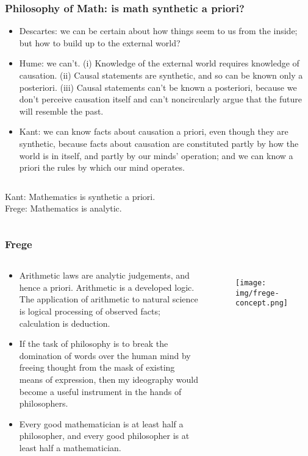 \documentclass[UTF8,11pt,colorlinks,compress,openany]{beamer}%
\begin{document}
\begin{frame}\frametitle{Philosophy of Math: is math synthetic a priori?}
\begin{itemize}
	\item Descartes: we can be certain about how things seem to us from the inside; but how to build up to the external world?
	\item Hume: we can't. (i) Knowledge of the external world requires knowledge of causation. (ii) Causal statements are synthetic, and so can be known only a posteriori. (iii) Causal statements can't be known a posteriori, because we don't perceive causation itself and can't noncircularly argue that the future will resemble the past.
	\item Kant: we can know facts about causation a priori, even though they are synthetic, because facts about causation are constituted partly by how the world is in itself, and partly by our minds' operation; and we can know a priori the rules by which our mind operates.
\end{itemize}
\begin{columns}
Kant: Mathematics is synthetic a priori.\\
Frege: Mathematics is analytic.
\end{columns}
\end{frame}

\begin{frame}\frametitle{Frege}
\begin{columns}
\begin{block}{}
	\begin{itemize}
		\item Arithmetic laws are analytic judgements, and hence a priori. Arithmetic is a developed logic. The application of arithmetic to natural science is logical processing of observed facts; calculation is deduction.
		\item If the task of philosophy is to break the domination of words over the human mind by freeing thought from the mask of existing means of expression, then my ideography would become a useful instrument in the hands of philosophers.
		\item Every good mathematician is at least half a philosopher, and every good philosopher is at least half a mathematician.
	\end{itemize}
\end{block}
\begin{figure}[H]
\texttt{[image: img/frege-concept.png]}
\end{figure}
\end{columns}
\end{frame}
\end{document}
